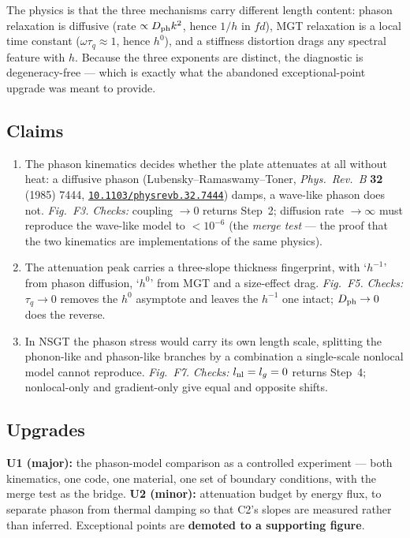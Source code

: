 \documentclass[11pt]{article}
\newcommand{\doi}[1]{\href{https://doi.org/#1}{\texttt{#1}}}
\begin{document}
The physics is that the three mechanisms carry different length content: phason relaxation is
diffusive (rate $\propto D_{\rm ph}k^{2}$, hence $1/h$ in $fd$), MGT relaxation is a local time
constant ($\omega\tau_q\approx1$, hence $h^{0}$), and a stiffness distortion drags any spectral
feature with $h$. Because the three exponents are distinct, the diagnostic is degeneracy-free ---
which is exactly what the abandoned exceptional-point upgrade was meant to provide.

\subsection*{Claims}
\begin{enumerate}\small
\item[\textbf{C1}] The phason kinematics decides whether the plate attenuates at all without heat:
  a diffusive phason (Lubensky--Ramaswamy--Toner, \emph{Phys.\ Rev.\ B} \textbf{32} (1985) 7444,
  \doi{10.1103/physrevb.32.7444}) damps, a wave-like phason does not. \emph{Fig.\ F3.}
  \emph{Checks:} coupling $\to0$ returns Step~2; diffusion rate $\to\infty$ must reproduce the
  wave-like model to $<10^{-6}$ (the \emph{merge test} --- the proof that the two kinematics are
  implementations of the same physics).
\item[\textbf{C2}] The attenuation peak carries a three-slope thickness fingerprint, with `$h^{-1}$'
  from phason diffusion, `$h^0$' from MGT and a size-effect drag. \emph{Fig.\ F5.}
  \emph{Checks:} $\tau_q\to0$ removes the $h^0$ asymptote and leaves the $h^{-1}$ one intact;
  $D_{\rm ph}\to0$ does the reverse.
\item[\textbf{C3}] In NSGT the phason stress would carry its own length scale, splitting the
  phonon-like and phason-like branches by a combination a single-scale nonlocal model cannot
  reproduce. \emph{Fig.\ F7.} \emph{Checks:} $l_{\rm nl}=l_g=0$ returns Step~4; nonlocal-only and
  gradient-only give equal and opposite shifts.
\end{enumerate}

\subsection*{Upgrades}
\textbf{U1 (major):} the phason-model comparison as a controlled experiment --- both kinematics, one
code, one material, one set of boundary conditions, with the merge test as the bridge.
\textbf{U2 (minor):} attenuation budget by energy flux, to separate phason from thermal damping so
that C2's slopes are measured rather than inferred. Exceptional points are \textbf{demoted to a
supporting figure}.
\end{document}
